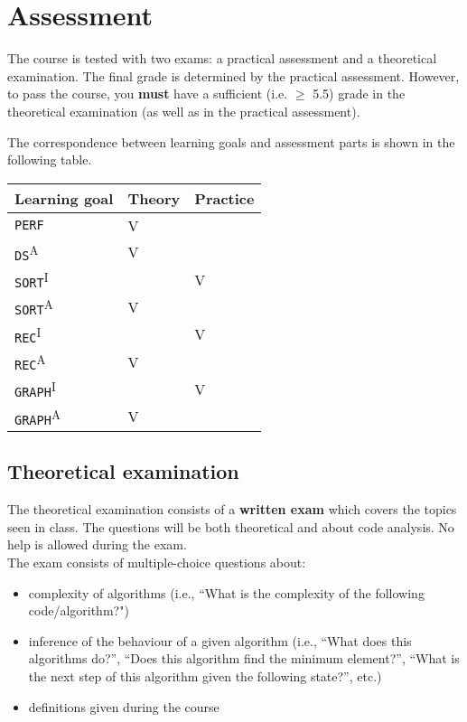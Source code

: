 \section{Assessment}
	The course is tested with two exams: a practical assessment and a theoretical examination. The final grade is determined by the practical assessment. However, to pass the course, you \textbf{must} have a sufficient (i.e. $\geq$ 5.5) grade in the theoretical examination (as well as in the practical assessment).
	
	The correspondence between learning goals and assessment parts is shown in the following table. \\
	
	\begin{table}[h]
		\centering
	\begin{tabular}{ |l|l|l| }
		\hline
		\textbf{Learning goal} & \textbf{Theory} & \textbf{Practice} \\
		\hline
		\texttt{PERF} & V & \\
		\hline 
		\texttt{DS}\textsuperscript{A} & V & \\
		\hline 
		\texttt{SORT}\textsuperscript{I} & & V \\
		\hline 
		\texttt{SORT}\textsuperscript{A} & V & \\
		\hline 
		\texttt{REC}\textsuperscript{I} & & V \\
		\hline 
		\texttt{REC}\textsuperscript{A} & V &  \\
		\hline 
		\texttt{GRAPH}\textsuperscript{I} & & V \\
		\hline 
		\texttt{GRAPH}\textsuperscript{A} & V & \\
		\hline 
	\end{tabular}
	\end{table}

	\subsection{Theoretical examination}
	The theoretical examination consists of a \textbf{written exam} which covers the topics seen in class. The questions will be both theoretical and about code analysis. No help is allowed during the exam.\\
	
	The exam consists of multiple-choice questions about:
	\begin{itemize}
		\item complexity of algorithms (i.e., ``What is the complexity of the following code/algorithm?")
		\item inference of the behaviour of a given algorithm (i.e., ``What does this algorithms do?'', ``Does this algorithm find the minimum element?'', ``What is the next step of this algorithm given the following state?'', etc.)
		\item definitions given during the course
	\end{itemize}


